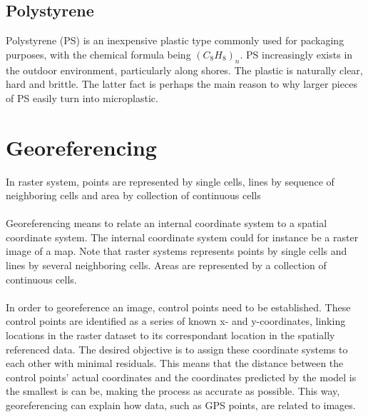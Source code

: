 \subsection{Polystyrene}
Polystyrene (PS) is an inexpensive plastic type commonly used for packaging purposes, with the chemical formula being $(C_8H_8)_n$. PS increasingly exists in the outdoor environment, particularly along shores. The plastic is naturally clear, hard and brittle. The latter fact is perhaps the main reason to why larger pieces of PS easily turn into microplastic. 

\vspace{1.3cm}
\section{Georeferencing}
In raster system, points are represented by single cells, lines by sequence of neighboring cells and area by collection of continuous cells
\\\\
Georeferencing means to relate an internal coordinate system to a spatial coordinate system. The internal coordinate system could for instance be a raster image of a map. 
Note that raster systems represents points by single cells and lines by several neighboring cells. Areas are represented by a collection of continuous cells. 
\\\\
In order to georeference an image, control points need to be established. These control points are identified as a series of known x- and y-coordinates, linking locations in the raster dataset to its correspondant location in the spatially referenced data. The desired objective is to assign these coordinate systems to each other with minimal residuals. This means that the distance between the control points’ actual coordinates and the coordinates predicted by the model is the smallest is can be, making the process as accurate as possible. This way, georeferencing can explain how data, such as GPS points, are related to images.

\vspace{1.3cm}
